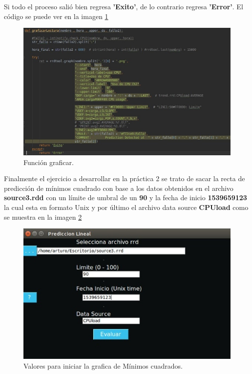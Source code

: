 \begin{itemize}
Si todo el proceso salió bien regresa \textbf{'Exito'}, de lo contrario regresa \textbf{'Error'}.
El código se puede ver en la imagen \ref{image:op1}

\FloatBarrier
\begin{figure}[htbp!]
		\centering
		    \includegraphics[width=.9 \textwidth]{../images/op1.jpeg}
		\caption{Función graficar.}
		\label{image:op1}
\end{figure}
\FloatBarrier

\end{itemize}

Finalmente el ejercicio a desarrollar en la práctica 2 se trato de sacar la recta de predicción de mínimos cuadrado con base a los datos obtenidos en el archivo \textbf{source3.rdd} con un límite de umbral de un \textbf{90}  y la fecha de inicio \textbf{1539659123} la cual esta en formato Unix y por último el archivo data source \textbf{CPUload} como se muestra en la imagen  \ref{image:inicio}

\FloatBarrier
\begin{figure}[htbp!]
		\centering
		    \includegraphics[width=.7 \textwidth]{../images/inicio.jpeg}
		\caption{Valores para iniciar la grafica de Mínimos cuadrados.}
		\label{image:inicio}
\end{figure}
\FloatBarrier


